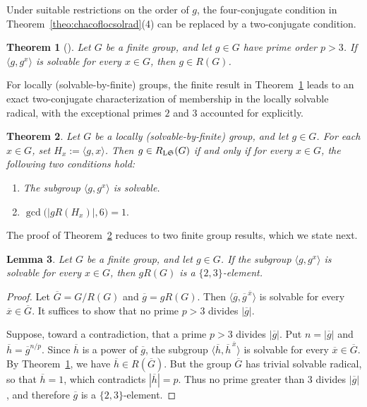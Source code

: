 \documentclass[11pt, reqno]{amsart}
\numberwithin{equation}{section}
\newtheorem{theorem}{Theorem}[section]
\newtheorem{lemma}[theorem]{Lemma}
\theoremstyle{definition}
\numberwithin{equation}{section}
\begin{document}
Under suitable restrictions on the order of $g$, the four-conjugate condition in Theorem~\ref{theo:chacoflocsolrad}\textup{(4)} can be replaced by a two-conjugate condition. 

\begin{theorem}[{\cite[Theorem 1.4]{Gordeev2010}}]\label{prop:finite-prime}
Let $G$ be a finite group, and let $g\in G$ have prime order $p>3$.
If $\langle g,g^x\rangle$ is solvable for every $x\in G$, then $g\in R(G)$.
\end{theorem}

For locally (solvable-by-finite) groups, the finite result in Theorem~\ref{prop:finite-prime} leads to an exact two-conjugate characterization of membership in the locally solvable radical, with the exceptional primes $2$ and $3$ accounted for explicitly.

\begin{theorem}\label{thm:two-conjugate-23prime}
Let $G$ be a locally \textup{(\emph{solvable}-\emph{by}-\emph{finite})} group, and let $g\in G$. For each $x\in G$, set $H_x:=\langle g,x\rangle$. Then $g\in R_{\textup{L}\mathfrak{S}}(G)$ if and only if for every $x\in G$, the following two conditions hold: 
\begin{enumerate}[label = \textup{(\roman*)}]
    \item The subgroup $\langle g,g^x\rangle$ is solvable.
    \item $\gcd\bigl(|gR(H_x)|,6\bigr)=1.$ \end{enumerate}
\end{theorem}

The proof of Theorem~\ref{thm:two-conjugate-23prime} reduces to two finite group results, which we state next.

\begin{lemma}\label{lem212}
Let $G$ be a finite group, and let $g \in G$. If the subgroup $\langle g, g^x \rangle$ is solvable for every $x \in G$, then $gR(G)$ is a $\{2,3\}$-element. 
\end{lemma}

\begin{proof}
Let $\overline{G}=G/R(G)$ and $\overline{g}=gR(G)$. Then $\langle\overline{g},\overline{g}^{\,\overline{x}}\rangle$ is solvable for every $\overline{x}\in\overline{G}$. It suffices to  show that no prime $p>3$ divides $|\overline{g}|$.

Suppose, toward a contradiction, that a prime $p>3$ divides $|\overline{g}|$. Put $n=|\overline{g}|$ and $\overline{h}=\overline{g}^{n/p}$. Since $\overline{h}$ is a power of $\overline{g}$, the subgroup $\langle\overline{h},\overline{h}^{\,\overline{x}}\rangle$ is solvable for every $\overline{x}\in\overline{G}$. By Theorem~\ref{prop:finite-prime}, we have $\overline{h}\in R(\overline{G})$. But the group $\overline{G}$ has trivial solvable radical, so that $\overline{h}=1$, which contradicts  $|\overline{h}|=p$. Thus no prime greater than $3$ divides $|\overline{g}|$, and therefore $\overline{g}$ is a $\{2,3\}$-element.
\end{proof}
\end{document}
